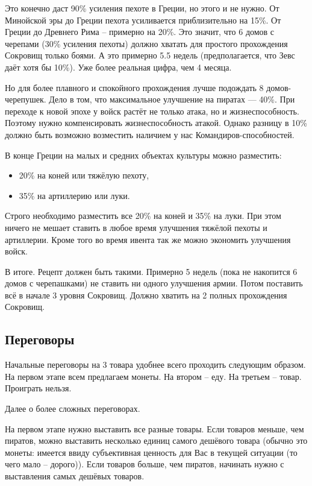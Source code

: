 Это конечно даст 90\% усиления пехоте в Греции, но этого и не нужно.
От Минойской эры до Греции пехота усиливается приблизительно на 15\%. 
От Греции до Древнего Рима -- примерно на 20\%. Это значит, что 6 домов с черепами (30\% усиления пехоты) должно хватать для простого прохождения Сокровищ только боями. 
А это примерно 5.5 недель (предполагается, что Зевс даёт хотя бы 10\%).
Уже более реальная цифра, чем 4 месяца.

Но для более плавного и спокойного прохождения лучше подождать 8 домов-черепушек.
Дело в том, что максимальное улучшение на пиратах — 40\%.
При переходе к новой эпохе у войск растёт не только атака, но и жизнеспособность.
Поэтому нужно компенсировать жизнеспособность атакой.
Однако разницу в 10\% должно быть возможно возместить наличием у нас Командиров-способностей.

В конце Греции на малых и средних объектах культуры можно разместить:
\begin{itemize}
    \item 20\% на коней или тяжёлую пехоту,
    \item 35\% на артиллерию или луки.
\end{itemize}
Строго необходимо разместить все 20\% на коней и 35\% на луки.
При этом ничего не мешает ставить в любое время улучшения тяжёлой пехоты и артиллерии.
Кроме того во время ивента так же можно экономить улучшения войск.

В итоге.
Рецепт должен быть такими.
Примерно 5 недель (пока не накопится 6 домов с черепашками) не ставить ни одного улучшения армии. Потом поставить всё в начале 3 уровня Сокровищ. Должно хватить на 2 полных прохождения Сокровищ.


\subsection{Переговоры}

Начальные переговоры на 3 товара удобнее всего проходить следующим образом. 
На первом этапе всем предлагаем монеты. 
На втором -- еду. 
На третьем -- товар.
Проиграть нельзя.

Далее о более сложных переговорах.

На первом этапе нужно выставить все разные товары. 
Если товаров меньше, чем пиратов, можно выставить несколько единиц самого дешёвого товара (обычно это монеты: имеется ввиду субъективная ценность для Вас в текущей ситуации (то чего мало -- дорого)). 
Если товаров больше, чем пиратов, начинать нужно с выставления самых дешёвых товаров.

